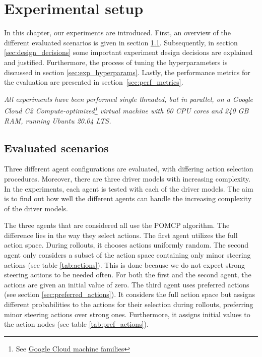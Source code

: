 \chapter{Experimental setup}
\label{ch:setup}



In this chapter, our experiments are introduced. First, an overview of the different evaluated scenarios is given in section \ref{sec:scenarios}. Subsequently, in section \ref{sec:design_decisions} some important experiment design decisions are explained and justified. Furthermore, the process of tuning the hyperparameters is discussed in section \ref{sec:exp_hyperparams}. Lastly, the performance metrics for the evaluation are presented in section~\ref{sec:perf_metrics}.

\emph{All experiments have been performed single threaded, but in parallel, on a Google Cloud C2 Compute-optimized\footnote{See \href{https://cloud.google.com/compute/docs/machine-types}{Google Cloud machine families}} virtual machine with 60 CPU cores and 240 GB RAM, running Ubuntu 20.04 LTS.}



\section{Evaluated scenarios}
\label{sec:scenarios}

Three different agent configurations are evaluated, with differing action selection procedures. Moreover, there are three driver models with increasing complexity. In the experiments, each agent is tested with each of the driver models. The aim is to find out how well the different agents can handle the increasing complexity of the driver models.

The three agents that are considered all use the POMCP algorithm. The difference lies in the way they select actions. The first agent utilizes the full action space. During rollouts, it chooses actions uniformly random. The second agent only considers a subset of the action space containing only minor steering actions (see table \ref{tab:actions}). This is done because we do not expect strong steering actions to be needed often. For both the first and the second agent, the actions are given an initial value of zero. The third agent uses preferred actions (see section \ref{sec:preferred_actions}). It considers the full action space but assigns different probabilities to the actions for their selection during rollouts, preferring minor steering actions over strong ones. Furthermore, it assigns initial values to the action nodes (see table \ref{tab:pref_actions}).

